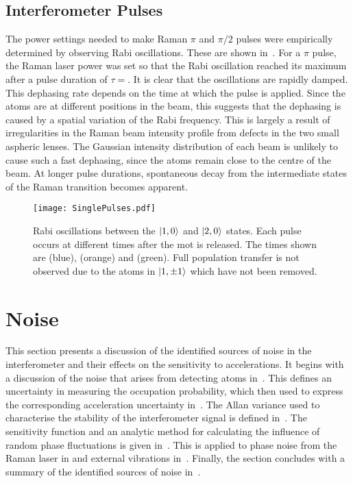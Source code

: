 \subsection{Interferometer Pulses}\label{subsec:int_pulses}
The power settings needed to make Raman $\pi$ and $\pi/2$ pulses were
empirically determined by observing Rabi oscillations. These are shown
in~. For a $\pi$ pulse, the Raman
laser power was
set so that the Rabi oscillation reached its maximum after a pulse duration of
\(\tau = \). It is clear that the oscillations
are rapidly damped. This dephasing rate depends on the
time at which the pulse is applied. Since the atoms are at different
positions in the beam, this suggests that the dephasing is caused by a
spatial variation of the Rabi frequency. This is largely a result of
irregularities in the Raman beam intensity profile from defects in
the two small aspheric lenses. The Gaussian intensity distribution of each beam
is unlikely to cause such a fast dephasing, since the atoms remain
close to the centre of the beam. At longer pulse durations,
spontaneous decay from the intermediate states of the Raman transition
becomes apparent.
\begin{figure}[htpb]
  \centering
  \texttt{[image: SinglePulses.pdf]}
  \caption[Rabi oscillations between the $\ket{1,0}$ and $\ket{2,0}$
    states.]{Rabi oscillations between the $\ket{1,0}$ and $\ket{2,0}$
    states. Each pulse occurs at different times after the \ac{mot} is
    released. The times shown are  (blue),
   (orange) and  (green). Full
  population transfer is not observed due to the atoms in $\ket{1,\pm
1}$ which have not been removed. }
\label{fig:rabi_oscillation}
\end{figure}
\section{Noise}\label{sec:atomint_sensitivity}
This section presents a discussion of the identified sources of
noise in the interferometer and their effects on the sensitivity to
accelerations. It begins with a discussion of the noise that arises
from detecting atoms in~. This
defines an uncertainty in measuring the occupation probability, which then used to
express the corresponding acceleration uncertainty
in~. The Allan variance used to characterise
the stability of the interferometer signal is defined
in~. The sensitivity function and an analytic method
for calculating the influence of random phase fluctuations is given
in~. This is applied to phase noise from
the Raman laser in  and external
vibrations in~. Finally, the
section concludes with a summary of the identified sources of noise
in~.
